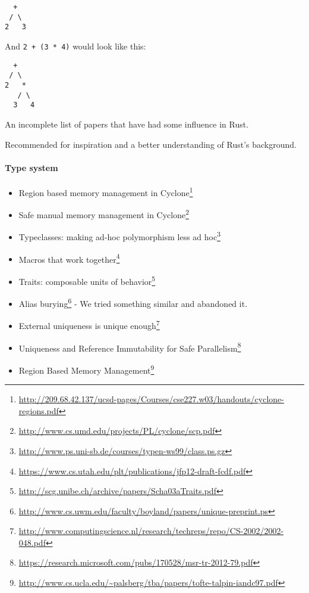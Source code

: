 \documentclass[a4paper,]{book}
\renewcommand{\href}[2]{#2\footnote{\url{#1}}}
\begin{document}
\begin{verbatim}
  +
 / \
2   3
\end{verbatim}

And \texttt{2\ +\ (3\ *\ 4)} would look like this:

\begin{verbatim}
  +
 / \
2   *
   / \
  3   4
\end{verbatim}


An incomplete list of papers that have had some influence in Rust.

Recommended for inspiration and a better understanding of Rust's
background.

\paragraph{Type system}\label{type-system}

\begin{itemize}
\itemsep1pt\parskip0pt
\item
  \href{http://209.68.42.137/ucsd-pages/Courses/cse227.w03/handouts/cyclone-regions.pdf}{Region
  based memory management in Cyclone}
\item
  \href{http://www.cs.umd.edu/projects/PL/cyclone/scp.pdf}{Safe manual
  memory management in Cyclone}
\item
  \href{http://www.ps.uni-sb.de/courses/typen-ws99/class.ps.gz}{Typeclasses:
  making ad-hoc polymorphism less ad hoc}
\item
  \href{https://www.cs.utah.edu/plt/publications/jfp12-draft-fcdf.pdf}{Macros
  that work together}
\item
  \href{http://scg.unibe.ch/archive/papers/Scha03aTraits.pdf}{Traits:
  composable units of behavior}
\item
  \href{http://www.cs.uwm.edu/faculty/boyland/papers/unique-preprint.ps}{Alias
  burying} - We tried something similar and abandoned it.
\item
  \href{http://www.computingscience.nl/research/techreps/repo/CS-2002/2002-048.pdf}{External
  uniqueness is unique enough}
\item
  \href{https://research.microsoft.com/pubs/170528/msr-tr-2012-79.pdf}{Uniqueness
  and Reference Immutability for Safe Parallelism}
\item
  \href{http://www.cs.ucla.edu/~palsberg/tba/papers/tofte-talpin-iandc97.pdf}{Region
  Based Memory Management}
\end{itemize}
\end{document}
